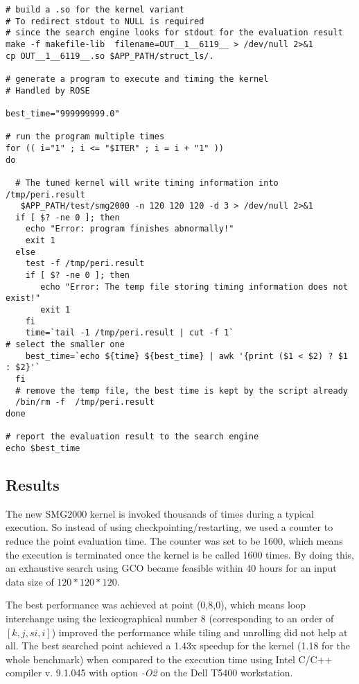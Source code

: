 {\begin{verbatim}
# build a .so for the kernel variant
# To redirect stdout to NULL is required
# since the search engine looks for stdout for the evaluation result
make -f makefile-lib  filename=OUT__1__6119__ > /dev/null 2>&1
cp OUT__1__6119__.so $APP_PATH/struct_ls/.

# generate a program to execute and timing the kernel
# Handled by ROSE

best_time="999999999.0"

# run the program multiple times
for (( i="1" ; i <= "$ITER" ; i = i + "1" ))
do

  # The tuned kernel will write timing information into /tmp/peri.result
   $APP_PATH/test/smg2000 -n 120 120 120 -d 3 > /dev/null 2>&1
  if [ $? -ne 0 ]; then
    echo "Error: program finishes abnormally!"
    exit 1
  else
    test -f /tmp/peri.result
    if [ $? -ne 0 ]; then
       echo "Error: The temp file storing timing information does not exist!"
       exit 1
    fi
    time=`tail -1 /tmp/peri.result | cut -f 1`
# select the smaller one
    best_time=`echo ${time} ${best_time} | awk '{print ($1 < $2) ? $1 : $2}'`
  fi
  # remove the temp file, the best time is kept by the script already
  /bin/rm -f  /tmp/peri.result
done

# report the evaluation result to the search engine
echo $best_time

\end{verbatim}
} %
\subsection{Results}
The new SMG2000 kernel is invoked thousands of times during a typical execution.
So instead of using checkpointing/restarting, we used a counter to reduce
the point evaluation time. The counter was set to be 1600, which means the
execution is terminated once the kernel is be called 1600 times.
By doing this, an exhaustive search using GCO
became feasible within 40 hours for an input data size of $120*120*120$.

The best performance was achieved at point (0,8,0), which means loop
interchange using the lexicographical number 8 (corresponding to an order of $[k,j,si,i]$) improved the
performance while tiling and unrolling did not help at all.
The best searched point achieved a 1.43x speedup for the kernel (1.18 for the whole
benchmark) when compared to the execution time using Intel C/C++ compiler v. 9.1.045 with option \textit{-O2}
on the Dell T5400 workstation.


